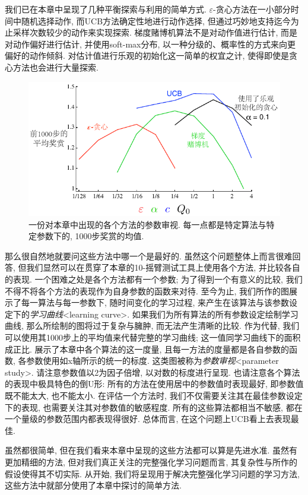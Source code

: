 我们已在本章中呈现了几种平衡探索与利用的简单方式. $\varepsilon$-贪心方法在一小部分时间中随机选择动作, 而UCB方法确定性地进行动作选择, 但通过巧妙地支持迄今为止采样次数较少的动作来实现探索. 梯度赌博机算法不是对动作值进行估计, 而是对动作偏好进行估计, 并使用soft-max分布, 以一种分级的、概率性的方式来向更偏好的动作倾斜. 对估计值进行乐观的初始化这一简单的权宜之计, 使得即使是贪心方法也会进行大量探索.

\vspace{1em}
\begin{figure}[ht]
\centering
\includegraphics[width=.75\textwidth]{c2/img/figure2-6.pdf}
\caption{一份对本章中出现的各个方法的参数审视. 每一点都是特定算法与特定参数下的, 1000步奖赏的均值.}\label{fig:2.6}
\end{figure}

那么很自然地就要问这些方法中哪一个是最好的. 虽然这个问题整体上而言很难回答, 但我们显然可以在贯穿了本章的10-摇臂测试工具上使用各个方法, 并比较各自的表现. 一个困难之处是各个方法都有一个参数; 为了得到一个有意义的比较, 我们不得不将各个方法的表现作为自身参数的函数来对待. 至今为止, 我们所作的图展示了每一算法与每一参数下, 随时间变化的学习过程, 来产生在该算法与该参数设定下的\emph{学习曲线}<learning curve>. 如果我们为所有算法的所有参数设定绘制学习曲线, 那么所绘制的图将过于复杂与臃肿, 而无法产生清晰的比较. 作为代替, 我们可以使用其1000步上的平均值来代替完整的学习曲线; 这一值同学习曲线下的面积成正比. 展示了本章中各个算法的这一度量, 且每一方法的度量都是各自参数的函数, 各参数使用如x轴所示的统一的标度. 这类图被称为\emph{参数审视}<parameter study>. 请注意参数值以2为因子倍增, 以对数的标度进行呈现. 也请注意各个算法的表现中极具特色的倒U形: 所有的方法在使用居中的参数值时表现最好, 即参数值既不能太大, 也不能太小. 在评估一个方法时, 我们不仅需要关注其在最佳参数设定下的表现, 也需要关注其对参数值的敏感程度. 所有的这些算法都相当不敏感, 都在一个量级的参数范围内都表现得很好. 总体而言, 在这个问题上UCB看上去表现最佳.

虽然都很简单, 但在我们看来本章中呈现的这些方法都可以算是先进水准. 虽然有更加精细的方法, 但对我们真正关注的完整强化学习问题而言, 其复杂性与所作的假设使得其不切实际. 从开始, 我们将呈现用于解决完整强化学习问题的学习方法, 这些方法中就部分使用了本章中探讨的简单方法.

